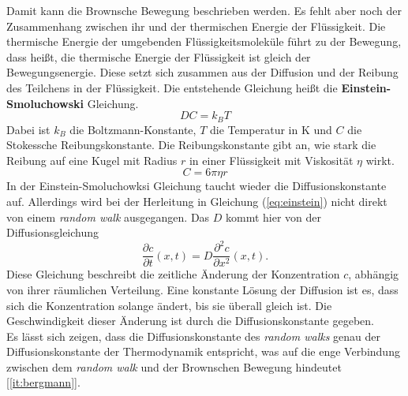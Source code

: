 Damit kann die Brownsche Bewegung beschrieben werden. Es fehlt aber noch der Zusammenhang zwischen ihr und der thermischen Energie der Flüssigkeit. Die thermische Energie der umgebenden Flüssigkeitsmoleküle führt zu der Bewegung, dass heißt, die thermische Energie der Flüssigkeit ist gleich der Bewegungsenergie. Diese setzt sich zusammen aus der Diffusion und der Reibung des Teilchens in der Flüssigkeit. Die entstehende Gleichung heißt die  \textbf{Einstein-Smoluchowski} Gleichung.
\begin{equation}
  D C = k_B T \label{eq:einstein}
\end{equation}
Dabei ist $k_B$ die Boltzmann-Konstante, $T$ die Temperatur in K und $C$ die Stokessche Reibungskonstante. Die Reibungskonstante gibt an, wie stark die Reibung auf eine Kugel mit Radius $r$ in einer Flüssigkeit mit Viskosität $\eta$ wirkt.
\begin{equation}
  C = 6 \pi \eta r
\end{equation}
In der Einstein-Smoluchowksi Gleichung taucht wieder die Diffusionskonstante auf. Allerdings wird bei der Herleitung in Gleichung (\ref{eq:einstein}) nicht direkt von einem \emph{random walk} ausgegangen. Das $D$ kommt hier von der Diffusionsgleichung
\begin{equation}
  \frac{\partial c}{\partial t}(x, t) = D \frac{\partial^2 c}{\partial x^2} (x, t). \label{eq:diffusion}
\end{equation}
Diese Gleichung beschreibt die zeitliche Änderung der Konzentration $c$, abhängig von ihrer räumlichen Verteilung. Eine konstante Lösung der Diffusion ist es, dass sich die Konzentration solange ändert, bis sie überall gleich ist. Die Geschwindigkeit dieser Änderung ist durch die Diffusionskonstante gegeben.\\
Es lässt sich zeigen, dass die Diffusionskonstante des \emph{random walks} genau der Diffusionskonstante der Thermodynamik entspricht, was auf die enge Verbindung zwischen dem \emph{random walk} und der Brownschen Bewegung hindeutet [\ref{it:bergmann}].
